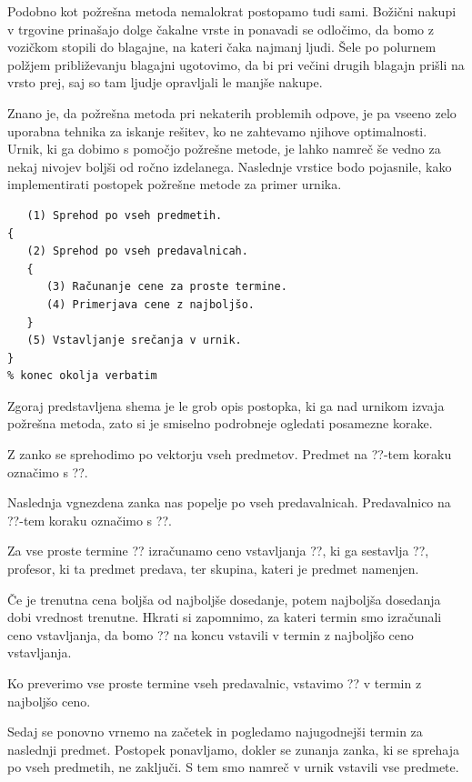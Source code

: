 \documentclass[a4paper,10pt]{article}
\begin{document}
Podobno kot požrešna metoda nemalokrat postopamo tudi sami. Božični nakupi v trgovine
prinašajo dolge čakalne vrste in ponavadi se odločimo, da bomo z vozičkom stopili do blagajne,
na kateri čaka najmanj ljudi. Šele po polurnem polžjem približevanju blagajni ugotovimo,
da bi pri večini drugih blagajn prišli na vrsto prej, saj so tam ljudje opravljali le
manjše nakupe.

Znano je, da požrešna metoda pri nekaterih problemih odpove, je pa vseeno zelo uporabna
tehnika za iskanje rešitev, ko ne zahtevamo njihove optimalnosti. Urnik, ki ga dobimo s
pomočjo požrešne metode, je lahko namreč še vedno za nekaj nivojev boljši od ročno izdelanega.
Naslednje vrstice bodo pojasnile, kako implementirati postopek požrešne metode za primer urnika.

\begin{verbatim}
   (1) Sprehod po vseh predmetih.
{
   (2) Sprehod po vseh predavalnicah.
   {
      (3) Računanje cene za proste termine.
      (4) Primerjava cene z najboljšo.
   }
   (5) Vstavljanje srečanja v urnik.
}
% konec okolja verbatim
\end{verbatim}

Zgoraj predstavljena shema je le grob opis postopka, ki ga nad urnikom izvaja požrešna metoda,
zato si je smiselno podrobneje ogledati posamezne korake.

   Z zanko se sprehodimo po vektorju vseh predmetov. Predmet na ??-tem koraku
   označimo s ??.

   Naslednja vgnezdena zanka nas popelje po vseh predavalnicah. Predavalnico na
   ??-tem koraku označimo s ??.

   Za vse proste termine ?? izračunamo ceno vstavljanja
   ??, ki ga sestavlja ??, profesor, ki ta predmet predava,
   ter skupina, kateri je predmet namenjen.

   Če je trenutna cena boljša od najboljše dosedanje, potem najboljša dosedanja
   dobi vrednost trenutne. Hkrati si zapomnimo, za kateri termin smo izračunali ceno
   vstavljanja, da bomo ?? na koncu vstavili v termin z najboljšo
   ceno vstavljanja.

   Ko preverimo vse proste termine vseh predavalnic, vstavimo ??
   v termin z najboljšo ceno.

   Sedaj se ponovno vrnemo na začetek in pogledamo najugodnejši termin za naslednji
   predmet. Postopek ponavljamo, dokler se zunanja zanka, ki se sprehaja po vseh predmetih,
   ne zaključi. S tem smo namreč v urnik vstavili vse predmete.
\end{document}
